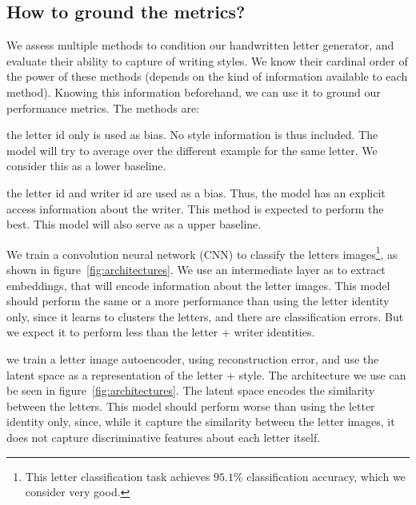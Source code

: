 \subsection{How to ground the metrics?}\label{subsec:ground_metrics}
\par We assess multiple methods to condition our handwritten letter generator, and evaluate their ability to capture of writing styles. We know their cardinal order of the power of these methods (depends on the kind of information available to each method). Knowing this information beforehand, we can use it to ground our performance metrics. The methods are:
\begin{description}[noitemsep]
    \item[Letter identity] the letter id only is used as bias. No style information is thus included. The model will try to average over the different example for the same letter. We consider this as a lower baseline.
    \item[Letter + Writer identities] the letter id and writer id are used as a bias. Thus, the model has an explicit access information about the writer. This method is expected to perform the best. This model will also serve as a upper baseline.
    \item[Image classifier embedding] We train a convolution neural network (CNN) to classify the letters images\footnote{This letter classification task achieves $95.1\%$ classification accuracy, which we consider very good.}, as shown in figure~\ref{fig:architectures}. We use an intermediate layer as to extract embeddings, that will encode information about the letter images. This model should perform the same or a more performance than using the letter identity only, since it learns to clusters the letters, and there are classification errors. But we expect it to perform less than the letter + writer identities.
    \item[Image auto-encoder latent space] we train a letter image autoencoder, using reconstruction error, and use the latent space as a representation of the letter + style. The architecture we use can be seen in figure~\ref{fig:architectures}. The latent space encodes the similarity between the letters. This model should perform worse than using the letter identity only, since, while it capture the similarity between the letter images, it does not capture discriminative features about each letter itself.
\end{description}

